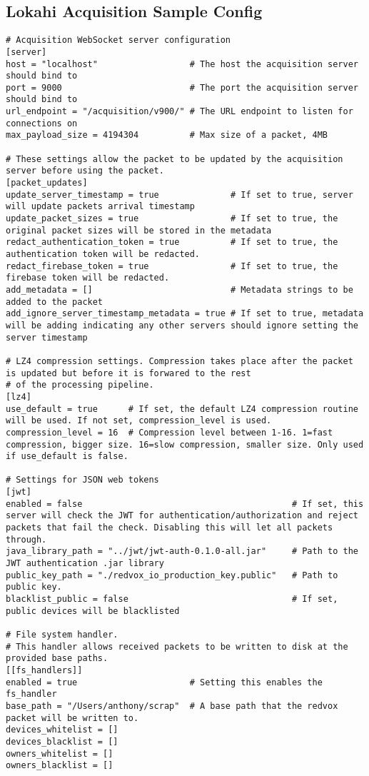 \subsection{Lokahi Acquisition Sample Config}
\label{lokahi_acquisition_config}
\begin{verbatim}
# Acquisition WebSocket server configuration
[server]
host = "localhost"                  # The host the acquisition server should bind to
port = 9000                         # The port the acquisition server should bind to
url_endpoint = "/acquisition/v900/" # The URL endpoint to listen for connections on
max_payload_size = 4194304          # Max size of a packet, 4MB

# These settings allow the packet to be updated by the acquisition server before using the packet.
[packet_updates]
update_server_timestamp = true              # If set to true, server will update packets arrival timestamp
update_packet_sizes = true                  # If set to true, the original packet sizes will be stored in the metadata
redact_authentication_token = true          # If set to true, the authentication token will be redacted.
redact_firebase_token = true                # If set to true, the firebase token will be redacted.
add_metadata = []                           # Metadata strings to be added to the packet
add_ignore_server_timestamp_metadata = true # If set to true, metadata will be adding indicating any other servers should ignore setting the server timestamp

# LZ4 compression settings. Compression takes place after the packet is updated but before it is forwared to the rest
# of the processing pipeline.
[lz4]
use_default = true      # If set, the default LZ4 compression routine will be used. If not set, compression_level is used.
compression_level = 16  # Compression level between 1-16. 1=fast compression, bigger size. 16=slow compression, smaller size. Only used if use_default is false.

# Settings for JSON web tokens
[jwt]
enabled = false                                         # If set, this server will check the JWT for authentication/authorization and reject packets that fail the check. Disabling this will let all packets through.
java_library_path = "../jwt/jwt-auth-0.1.0-all.jar"     # Path to the JWT authentication .jar library
public_key_path = "./redvox_io_production_key.public"   # Path to public key.
blacklist_public = false                                # If set, public devices will be blacklisted

# File system handler.
# This handler allows received packets to be written to disk at the provided base paths.
[[fs_handlers]]
enabled = true                      # Setting this enables the fs_handler
base_path = "/Users/anthony/scrap"  # A base path that the redvox packet will be written to.
devices_whitelist = []
devices_blacklist = []
owners_whitelist = []
owners_blacklist = []


\end{verbatim}
